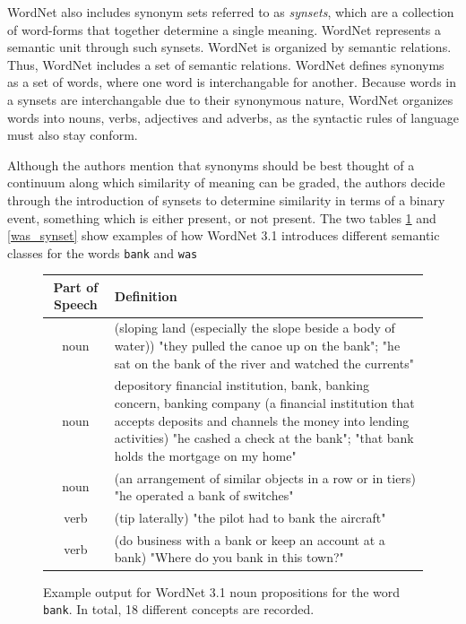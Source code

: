 \documentclass[a4paper,12pt,twoside,openright]{report}
\begin{document}
WordNet also includes synonym sets referred to as \textit{synsets}, which are a collection of word-forms that together determine a single meaning.
WordNet represents a semantic unit through such synsets.
WordNet is organized by semantic relations.
Thus, WordNet includes a set of semantic relations.
WordNet defines synonyms as a set of words, where one word is interchangable for another.
Because words in a synsets are interchangable due to their synonymous nature, WordNet organizes words into nouns, verbs, adjectives and adverbs, as the syntactic rules of language must also stay conform.

Although the authors mention that synonyms should be best thought of a continuum along which similarity of meaning can be graded, the authors decide through the introduction of synsets to determine similarity in terms of a binary event, something which is either present, or not present.
The two tables \ref{fig:bank_synset} and \ref{was_synset} show examples of how WordNet 3.1 introduces different semantic classes for the words \Verb#bank# and \Verb#was#

\begin{figure}
\begin{center}
\begin{tabular}{ | c | p{11cm} | } 
 \hline
 Part of Speech & Definition \\  
 \hline
noun     & (sloping land (especially the slope beside a body of water)) "they pulled the canoe up on the bank"; "he sat on the bank of the river and watched the currents"\\ 
noun     & depository financial institution, bank, banking concern, banking company (a financial institution that accepts deposits and channels the money into lending activities) "he cashed a check at the bank"; "that bank holds the mortgage on my home" \\ 
 noun     & (an arrangement of similar objects in a row or in tiers) "he operated a bank of switches"  \\ 
verb & (tip laterally) "the pilot had to bank the aircraft" \\ 
verb    & (do business with a bank or keep an account at a bank) "Where do you bank in this town?"  \\ 
 \hline
\end{tabular}
\end{center}
\caption{Example output for WordNet 3.1 noun propositions for the word \texttt{bank}. In total, 18 different concepts are recorded.}
\label{fig:bank_synset}
\end{figure}
\end{document}
